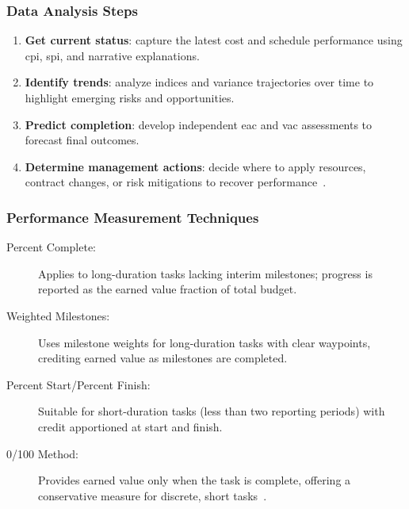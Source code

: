 \documentclass[../main.tex]{subfiles}
\begin{document}
\subsubsection{Data Analysis Steps}
\begin{enumerate}
  \item \textbf{Get current status}: capture the latest cost and schedule performance using \ac{cpi}, \ac{spi}, and narrative explanations.
  \item \textbf{Identify trends}: analyze indices and variance trajectories over time to highlight emerging risks and opportunities.
  \item \textbf{Predict completion}: develop independent \ac{eac} and \ac{vac} assessments to forecast final outcomes.
  \item \textbf{Determine management actions}: decide where to apply resources, contract changes, or risk mitigations to recover performance~\autocite{edo-3-6-2-evm-analysis-2025}.
\end{enumerate}
\subsubsection{Performance Measurement Techniques}
\begin{description}
  \item[Percent Complete:] Applies to long-duration tasks lacking interim milestones; progress is reported as the earned value fraction of total budget.
  \item[Weighted Milestones:] Uses milestone weights for long-duration tasks with clear waypoints, crediting earned value as milestones are completed.
  \item[Percent Start/Percent Finish:] Suitable for short-duration tasks (less than two reporting periods) with credit apportioned at start and finish.
  \item[0/100 Method:] Provides earned value only when the task is complete, offering a conservative measure for discrete, short tasks~\autocite{edo-3-6-2-evm-analysis-2025}.
\end{description}
\end{document}
